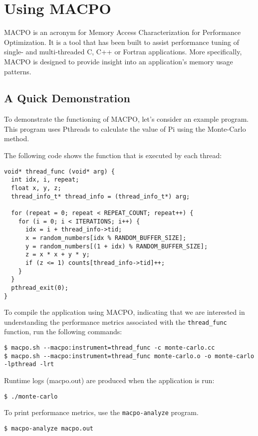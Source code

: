 \chapter{Using MACPO}
MACPO is an acronym for Memory Access Characterization for Performance Optimization. It is a tool that has been built to assist performance tuning of single- and multi-threaded C, C++ or Fortran applications. More specifically, MACPO is designed to provide insight into an application's memory usage patterns.

\section{A Quick Demonstration}
To demonstrate the functioning of MACPO, let's consider an example program. This program uses Pthreads to calculate the value of Pi using the Monte-Carlo method.

The following code shows the function that is executed by each thread:

\begin{verbatim}
void* thread_func (void* arg) {
  int idx, i, repeat;
  float x, y, z;
  thread_info_t* thread_info = (thread_info_t*) arg;

  for (repeat = 0; repeat < REPEAT_COUNT; repeat++) {
    for (i = 0; i < ITERATIONS; i++) {
      idx = i + thread_info->tid;
      x = random_numbers[idx % RANDOM_BUFFER_SIZE];
      y = random_numbers[(1 + idx) % RANDOM_BUFFER_SIZE];
      z = x * x + y * y;
      if (z <= 1) counts[thread_info->tid]++;
    }
  }
  pthread_exit(0);
}
\end{verbatim}

To compile the application using MACPO, indicating that we are interested in understanding the performance metrics associated with the \texttt{thread\_func} function, run the following commands:
\begin{verbatim}
$ macpo.sh --macpo:instrument=thread_func -c monte-carlo.cc
$ macpo.sh --macpo:instrument=thread_func monte-carlo.o -o monte-carlo -lpthread -lrt
\end{verbatim}

Runtime logs (macpo.out) are produced when the application is run:
\begin{verbatim}
$ ./monte-carlo
\end{verbatim}

To print performance metrics, use the \texttt{macpo-analyze} program.
\begin{verbatim}
$ macpo-analyze macpo.out
\end{verbatim}

